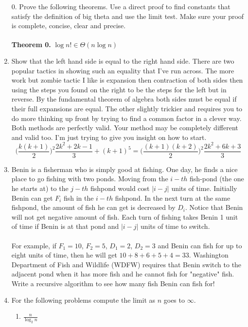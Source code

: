 \documentclass[12pt]{article}
\begin{document}
\begin{enumerate}
\item[0. ] Prove the following theorems. Use a direct proof to find constants that satisfy the
definition of big theta and use the limit test. Make sure your proof is complete, concise, clear
and precise.\\\\
\textbf{Theorem 0.} $\log{n!}\in\Theta(n\log{n})$
\newpage

\item Show that the left hand side is equal to the right hand side. 
There are two popular tactics in showing such an equality that I've run across. 
The more work but zombie tactic I like is expansion then contraction of both sides then using
the steps you found on the right to be the steps for the left but in reverse. By the fundamental theorem of algebra
both sides must be equal if their full expansions are equal. The other slightly
trickier and requires you to do more thinking up front by trying to find a common factor
in a clever way. Both methods are perfectly valid. Your method may be completely different and valid too.
I'm just trying to give you insight on how to start.
$$\bigg(\frac{k(k + 1)}{2}\bigg)^2\frac{2k^2+2k-1}{3} + (k + 1)^5=\big(\frac{(k+1)(k + 2)}{2}\big)^2\frac{2k^2+6k+3}{3} $$
\newpage
\item Benin is a fisherman who is simply good at fishing. One day, he finds a nice place to go fishing with two ponds. 
Moving from the $i-th$ fish-pond (the one he starts at) to the $j-th$ fishpond would cost $|i - j|$ units of time. 
Initially Benin can get $F_i$ fish in the $i-th$ fishpond. 
In the next turn at the same fishpond, the amount of fish he can get is decreased by $D_i$. 
Notice that Benin will not get negative amount of fish.
Each turn of fishing takes Benin 1 unit of time if Benin is at that pond and $|i - j|$ units of time to switch.
\\\\
For example, if $F_1 = 10$, $F_2 = 5$, $D_1 = 2$, $D_2 = 3$ and Benin can fish for up to eight units of time, then he will get $10 + 8 + 6 + 5 + 4 = 33$.
Washington Department of Fish and Wildlife (WDFW) requires that Benin switch to the adjacent pond when it has more fish and he cannot fish for "negative" fish.
Write a recursive algorithm to see how many fish Benin can fish for!
\newpage
\item For the following problems compute the limit as $n$ goes to $\infty$.
\begin{enumerate}
\item $\frac{n}{\log_2{n}}$

\end{enumerate}
\end{enumerate}
\end{document}
